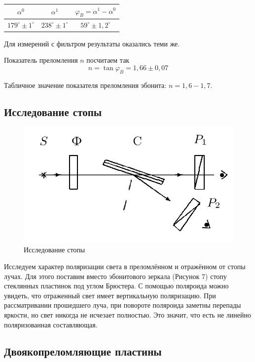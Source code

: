 \documentclass[a4paper,12pt]{article}
\begin{document}
\begin{table}[h!]
	\centering
	\begin{tabular}{|c|c|c|}
		\hline
		$\alpha^0$            & $\alpha^1$            & $\varphi_B = \alpha^1-\alpha^0$ \\ \hline
		$179^\circ\pm1^\circ$ & $238^\circ\pm1^\circ$ & $59^\circ\pm1,2^\circ$            \\ \hline
	\end{tabular}
\end{table}
Для измерений с фильтром результаты оказались теми же.

Показатель преломления $n$ посчитаем так
\[
	n = \tan{\varphi_B} = 1,66\pm0,07
\]

Табличное значение показателя преломления эбонита: $n = 1,6-1,7$.


\subsection{Исследование стопы}

\begin{figure}[h!]
    \centering
    \includegraphics[scale = 0.4]{6.png}
    \caption{Исследование стопы}
    \label{fig : 1}
\end{figure}


Исследуем характер поляризации света в преломлённом и отражённом от стопы лучах.  Для этого поставим вместо эбонитового зеркала (Рисунок 7) стопу стеклянных пластинок под углом Брюстера. С помощью поляроида можно увидеть, что отраженный свет имеет вертикальную поляризацию. При рассматривании прошедшего луча, при повороте поляроида заметны перепады яркости, но свет никогда не исчезает полностью. Это значит, что есть не линейно поляризованная составляющая.

\subsection{Двоякопреломляющие пластины}
\end{document}
